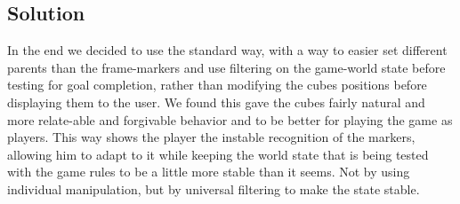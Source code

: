 \subsection{Solution}
In the end we decided to use the standard way, with a way to easier set different parents than the frame-markers and use filtering on the game-world state before testing for goal completion, rather than modifying the cubes positions before displaying them to the user. We found this gave the cubes fairly natural and more relate-able and forgivable behavior and to be better for playing the game as players. This way shows the player the instable recognition of the markers, allowing him to adapt to it while keeping the world state that is being tested with the game rules to be a little more stable than it seems. Not by using individual manipulation, but by universal filtering to make the state stable.
